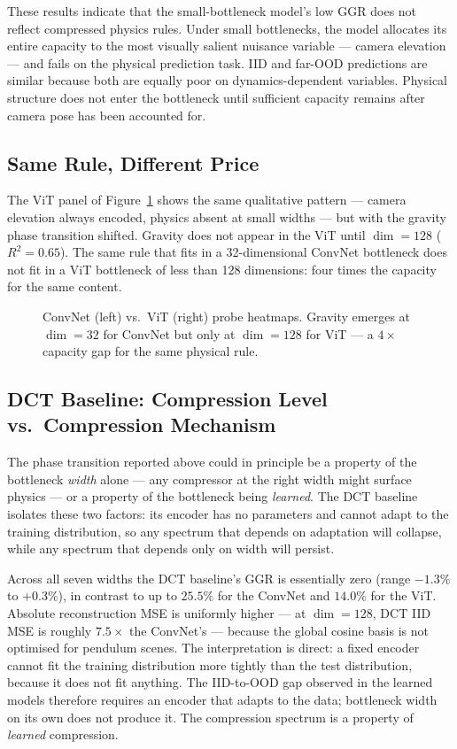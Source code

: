 \documentclass[letterpaper]{article} %
\begin{document}
These results indicate that the small-bottleneck model's low GGR does not reflect compressed physics rules. Under small bottlenecks, the model allocates its entire capacity to the most visually salient nuisance variable --- camera elevation --- and fails on the physical prediction task. IID and far-OOD predictions are similar because both are equally poor on dynamics-dependent variables. Physical structure does not enter the bottleneck until sufficient capacity remains after camera pose has been accounted for.

\subsection{Same Rule, Different Price}
\label{sec:tax}

The ViT panel of Figure~\ref{fig:dual} shows the same qualitative pattern --- camera elevation always encoded, physics absent at small widths --- but with the gravity phase transition shifted. Gravity does not appear in the ViT until $\dim = 128$ ($R^2 = 0.65$). The same rule that fits in a 32-dimensional ConvNet bottleneck does not fit in a ViT bottleneck of less than 128 dimensions: four times the capacity for the same content.

\begin{figure}[t]
    \centering
    
    \caption{ConvNet (left) vs.\ ViT (right) probe heatmaps. Gravity emerges at
    $\dim=32$ for ConvNet but only at $\dim=128$ for ViT --- a $4\times$
    capacity gap for the same physical rule.}
    \label{fig:dual}
\end{figure}

\subsection{DCT Baseline: Compression Level vs.\ Compression Mechanism}
\label{sec:dct}

The phase transition reported above could in principle be a property of the bottleneck \emph{width} alone --- any compressor at the right width might surface physics --- or a property of the bottleneck being \emph{learned}. The DCT baseline isolates these two factors: its encoder has no parameters and cannot adapt to the training distribution, so any spectrum that depends on adaptation will collapse, while any spectrum that depends only on width will persist.

Across all seven widths the DCT baseline's GGR is essentially zero (range $-1.3\%$ to $+0.3\%$), in contrast to up to $25.5\%$ for the ConvNet and $14.0\%$ for the ViT. Absolute reconstruction MSE is uniformly higher --- at $\dim=128$, DCT IID MSE is roughly $7.5{\times}$ the ConvNet's --- because the global cosine basis is not optimised for pendulum scenes. The interpretation is direct: a fixed encoder cannot fit the training distribution more tightly than the test distribution, because it does not fit anything. The IID-to-OOD gap observed in the learned models therefore requires an encoder that adapts to the data; bottleneck width on its own does not produce it. The compression spectrum is a property of \emph{learned} compression.
\end{document}
